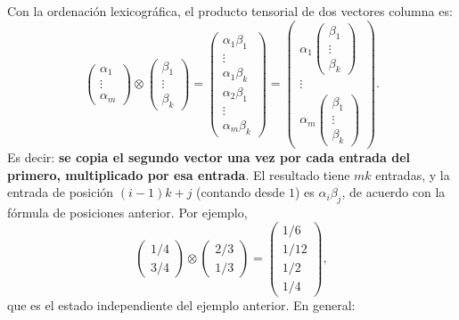 \documentclass[11pt, a4paper, twoside, openright]{report}
\begin{document}
\noindent Con la ordenación lexicográfica, el producto tensorial de dos vectores columna es:
\[
\begin{pmatrix} \alpha_1 \\ \vdots \\ \alpha_m \end{pmatrix} \otimes \begin{pmatrix} \beta_1 \\ \vdots \\ \beta_k \end{pmatrix}
= \begin{pmatrix} \alpha_1 \beta_1 \\ \vdots \\ \alpha_1 \beta_k \\ \alpha_2\beta_1 \\ \vdots \\ \alpha_m \beta_k \end{pmatrix}
= \begin{pmatrix} \alpha_1 \begin{pmatrix} \beta_1 \\ \vdots \\ \beta_k \end{pmatrix} \\ \vdots \\ \alpha_m \begin{pmatrix} \beta_1 \\ \vdots \\ \beta_k \end{pmatrix} \end{pmatrix}.
\]
Es decir: \textbf{se copia el segundo vector una vez por cada entrada del primero, multiplicado por esa entrada}. El resultado tiene $mk$ entradas, y la entrada de posición $(i-1)k + j$ (contando desde $1$) es $\alpha_i \beta_j$, de acuerdo con la fórmula de posiciones anterior. Por ejemplo,
\[ \begin{pmatrix} 1/4 \\ 3/4 \end{pmatrix} \otimes \begin{pmatrix} 2/3 \\ 1/3 \end{pmatrix} = \begin{pmatrix} 1/6 \\ 1/12 \\ 1/2 \\ 1/4 \end{pmatrix}, \]
que es el estado independiente del ejemplo anterior. En general:
\begin{center}
\end{center}
\end{document}

